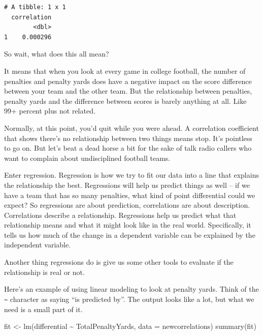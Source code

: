 \documentclass[
  letterpaper,
  DIV=11,
  numbers=noendperiod]{scrreprt}
\newenvironment{Shaded}{\begin{snugshade}}{\end{snugshade}}
\newcommand{\AttributeTok}[1]{\textcolor[rgb]{0.40,0.45,0.13}{#1}}
\newcommand{\FunctionTok}[1]{\textcolor[rgb]{0.28,0.35,0.67}{#1}}
\newcommand{\NormalTok}[1]{\textcolor[rgb]{0.00,0.23,0.31}{#1}}
\newcommand{\OtherTok}[1]{\textcolor[rgb]{0.00,0.23,0.31}{#1}}
\newcommand{\SpecialCharTok}[1]{\textcolor[rgb]{0.37,0.37,0.37}{#1}}
\begin{document}
\begin{verbatim}
# A tibble: 1 x 1
  correlation
        <dbl>
1    0.000296
\end{verbatim}

So wait, what does this all mean?

It means that when you look at every game in college football, the
number of penalties and penalty yards does have a negative impact on the
score difference between your team and the other team. But the
relationship between penalties, penalty yards and the difference between
scores is barely anything at all. Like 99+ percent plus not related.

Normally, at this point, you'd quit while you were ahead. A correlation
coefficient that shows there's no relationship between two things means
stop. It's pointless to go on. But let's beat a dead horse a bit for the
sake of talk radio callers who want to complain about undisciplined
football teams.

Enter regression. Regression is how we try to fit our data into a line
that explains the relationship the best. Regressions will help us
predict things as well -- if we have a team that has so many penalties,
what kind of point differential could we expect? So regressions are
about prediction, correlations are about description. Correlations
describe a relationship. Regressions help us predict what that
relationship means and what it might look like in the real world.
Specifically, it tells us how much of the change in a dependent variable
can be explained by the independent variable.

Another thing regressions do is give us some other tools to evaluate if
the relationship is real or not.

Here's an example of using linear modeling to look at penalty yards.
Think of the \texttt{\textasciitilde{}} character as saying ``is
predicted by''. The output looks like a lot, but what we need is a small
part of it.

\begin{Shaded}
\begin{Highlighting}[]
\NormalTok{fit }\OtherTok{\textless{}{-}} \FunctionTok{lm}\NormalTok{(differential }\SpecialCharTok{\textasciitilde{}}\NormalTok{ TotalPenaltyYards, }\AttributeTok{data =}\NormalTok{ newcorrelations)}
\FunctionTok{summary}\NormalTok{(fit)}
\end{Highlighting}
\end{Shaded}
\end{document}
